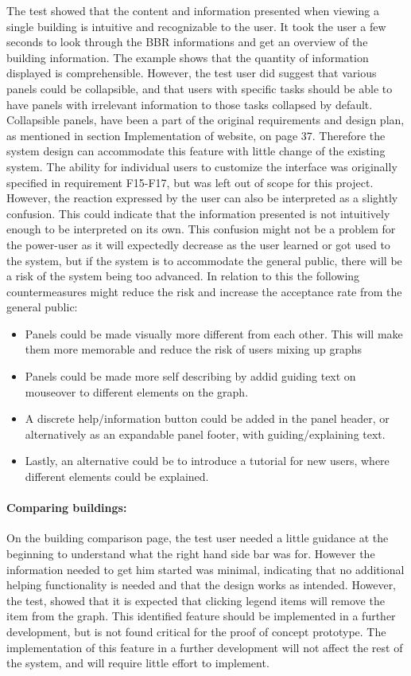The test showed that the content and information presented when viewing a single building is intuitive and recognizable to the user. It took the user a few seconds to look through the BBR informations and get an overview of the building information. The example shows that the quantity of information displayed is comprehensible. However, the test user did suggest that various panels could be collapsible, and that users with specific tasks should be able to have panels with irrelevant information to those tasks collapsed by default. Collapsible panels, have been a part of the original requirements and design plan, as mentioned in section Implementation of website, on page 37. Therefore the system design can accommodate this feature with little change of the existing system. The ability for individual users to customize the interface was originally specified in requirement F15-F17, but was left out of scope for this project. However, the reaction expressed by the user can also be interpreted as a slightly confusion. This could indicate that the information presented is not intuitively enough to be interpreted on its own. This confusion might not be a problem for the power-user as it will expectedly decrease as the user learned or got used to the system, but if the system is to accommodate the general public, there will be a risk of the system being too advanced. In relation to this the following countermeasures might reduce the risk and increase the acceptance rate from the general public:
\begin{itemize}
\item Panels could be made visually more different from each other. This will make them more memorable and reduce the risk of users mixing up graphs
\item Panels could be made more self describing by addid guiding text on mouseover to different elements on the graph. 
\item A discrete help/information button could be added in the panel header, or alternatively as an expandable panel footer, with guiding/explaining text. 
\item Lastly, an alternative could be to introduce a tutorial for new users, where different elements could be explained. 
\end{itemize}
\paragraph{Comparing buildings:} 
On the building comparison page, the test user needed a little guidance at the beginning to understand what the right hand side bar was for. However the information needed to get him started was minimal, indicating that no additional helping functionality is needed and that the design works as intended. However, the test, showed that it is expected that clicking legend items will remove the item from the graph. This identified feature should be implemented in a further development, but is not found critical for the proof of concept prototype. The implementation of this feature in a further development will not affect the rest of the system, and will require little effort to implement.
